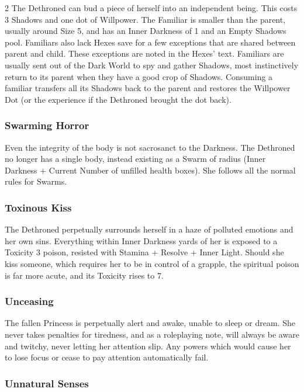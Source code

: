 \begin{multicols}{2}
\noindent The Dethroned can bud a piece of herself into an independent being. This costs 3 Shadows and one dot of Willpower. The Familiar is smaller than the parent, usually around Size 5, and has an Inner Darkness of 1 and an Empty Shadows pool. Familiars also lack Hexes save for a few exceptions that are shared between parent and child. These exceptions are noted in the  Hexes' text. Familiars are usually sent out of the Dark World to spy and gather Shadows, most instinctively return to its parent when they have a good crop of Shadows. Consuming a familiar transfers all its Shadows back to the parent and restores the Willpower Dot (or the experience if the Dethroned brought the dot back).

\subsubsection*{Swarming Horror}

Even the integrity of the body is not sacrosanct to the Darkness. The Dethroned no longer has a single body, instead existing as a Swarm of radius (Inner Darkness + Current Number of unfilled health boxes). She follows all the normal rules for Swarms.

\subsubsection*{Toxinous Kiss}

The Dethroned perpetually surrounds herself in a haze of polluted emotions and her own sins. Everything within Inner Darkness yards of her is exposed to a Toxicity 3 poison, resisted with Stamina + Resolve + Inner Light. Should she kiss someone, which requires her to be in control of a grapple, the spiritual poison is far more acute, and its Toxicity rises to 7.

\subsubsection*{Unceasing}

The fallen Princess is perpetually alert and awake, unable to sleep or dream. She never takes penalties for tiredness, and as a roleplaying note, will always be aware and twitchy, never letting her attention slip. Any powers which would cause her to lose focus or cease to pay attention automatically fail.

\subsubsection*{Unnatural Senses}


\end{multicols}
